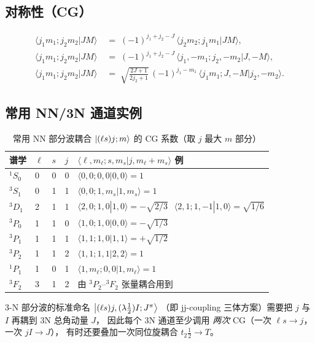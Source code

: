 \subsection{对称性（CG）}

\begin{align}
\langle j_1 m_1; j_2 m_2 | J M \rangle &\;=\;
(-1)^{j_1 + j_2 - J}\,
\langle j_2 m_2; j_1 m_1 | J M \rangle, \label{eq:appB_CG_swap}\\
\langle j_1 m_1; j_2 m_2 | J M \rangle &\;=\;
(-1)^{j_1 + j_2 - J}\,
\langle j_1, -m_1; j_2, -m_2 | J, -M \rangle, \label{eq:appB_CG_neg}\\
\langle j_1 m_1; j_2 m_2 | J M \rangle &\;=\;
\sqrt{\frac{2J+1}{2 j_2 + 1}}\,(-1)^{j_1 - m_1}\,
\langle j_1 m_1; J, -M | j_2, -m_2 \rangle. \label{eq:appB_CG_inv}
\end{align}

\subsection{常用 NN/3N 通道实例}

\begin{table}[htbp]
\centering
\caption{常用 NN 部分波耦合 $\ket{(\ell s) j; m}$ 的 CG 系数（取 $j$ 最大 $m$ 部分）}
\label{tab:appB_NN_channels}
\begin{tabular}{@{}lllll@{}}
\toprule
谱学 & $\ell$ & $s$ & $j$ & $\langle \ell, m_\ell; s, m_s | j, m_\ell + m_s \rangle$ 例 \\
\midrule
$^1S_0$  & 0 & 0 & 0 & $\langle 0,0;0,0|0,0\rangle = 1$ \\
$^3S_1$  & 0 & 1 & 1 & $\langle 0,0;1,m_s|1,m_s\rangle = 1$ \\
$^3D_1$  & 2 & 1 & 1 & $\langle 2,0;1,0|1,0\rangle = -\sqrt{2/3}\,\;\;\langle 2,1;1,-1|1,0\rangle = \sqrt{1/6}$ \\
$^3P_0$  & 1 & 1 & 0 & $\langle 1,0;1,0|0,0\rangle = -\sqrt{1/3}$ \\
$^3P_1$  & 1 & 1 & 1 & $\langle 1,1;1,0|1,1\rangle = +\sqrt{1/2}$ \\
$^3P_2$  & 1 & 1 & 2 & $\langle 1,1;1,1|2,2\rangle = 1$ \\
$^1P_1$  & 1 & 0 & 1 & $\langle 1,m_\ell;0,0|1,m_\ell\rangle = 1$ \\
$^3F_2$  & 3 & 1 & 2 & 由 $^3P_2$–$^3F_2$ 张量耦合用到 \\
\bottomrule
\end{tabular}
\end{table}

3-N 部分波的标准命名 $\ket{(\ell s)j, (\lambda \tfrac{1}{2})I; J^\pi}$
（即 jj-coupling 三体方案）需要把 $j$ 与 $I$ 再耦到 3N 总角动量 $J$，
因此每个 3N 通道至少调用 \emph{两次} CG（一次 $\ell s\to j$，一次 $j I\to J$），
有时还要叠加一次同位旋耦合 $t_2 \tfrac{1}{2}\to T$。

